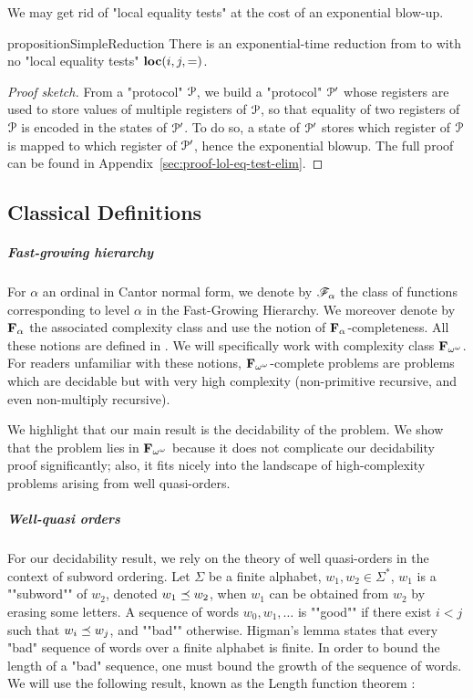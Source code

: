 We may get rid of "local equality tests" at the cost of an exponential blow-up.

\begin{restatable}{proposition}{SimpleReduction}
	\label{prop:loc-eq-test-elimination}
	There is an exponential-time reduction from \COVER to \COVER with no "local equality tests" $\textbf{loc}(i,j,=)$.
\end{restatable}
\begin{proof}[Proof sketch]
From a "protocol" $\mathcal{P}$, we build a "protocol" $\mathcal{P}'$ whose registers are used to store values of multiple registers of $\mathcal{P}$, so that equality of two registers of $\mathcal{P}$ is encoded in the states of $\mathcal{P}'$. To do so, a state of $\mathcal{P}'$ stores which register of $\mathcal{P}$ is mapped to which register of $\mathcal{P}'$, hence the exponential blowup. The full proof can be found in Appendix~\ref{sec:proof-lol-eq-test-elim}.
\end{proof}


\subsection{Classical Definitions}


\subparagraph*{Fast-growing hierarchy}

For $\alpha$ an ordinal in Cantor normal form, we denote by $\mathscr{F}_{\alpha}$ the class of functions corresponding to level $\alpha$ in the Fast-Growing Hierarchy. We moreover denote by $\mathbf{F}_{\alpha}$ the associated complexity class and use the notion of $\mathbf{F}_{\alpha}$-completeness. All these notions are defined in \cite{Schmitz16}. We will specifically work with complexity class $\mathbf{F}_{\omega^{\omega}}$. For readers unfamiliar with these notions, $\mathbf{F}_{\omega^{\omega}}$-complete problems are problems which are decidable but with very high complexity (non-primitive recursive, and even non-multiply recursive). 

We highlight that our main result is the decidability of the problem. We show that the problem lies in $\mathbf{F}_{\omega^{\omega}}$ because it does not complicate our decidability proof significantly; also, it fits nicely into the landscape of high-complexity problems arising from well quasi-orders. 

\subparagraph*{Well-quasi orders}

For our decidability result, we rely on the theory of well quasi-orders in the context of subword ordering.
Let $\Sigma$ be a finite alphabet, $w_1, w_2 \in \Sigma^*$, $w_1$ is a ""subword"" of $w_2$, denoted $w_1 \preceq w_2$, when $w_1$ can be obtained from $w_2$ by erasing some letters. 
A sequence of words $w_0, w_1, \ldots$ is ""good"" if there exist $i<j$ such that $w_i \preceq w_j$, and ""bad"" otherwise. Higman's lemma \cite{Higman52} states that every "bad" sequence of words over a finite alphabet is finite.
In order to bound the length of a "bad" sequence, one must bound the growth of the sequence of words. 
We will use the following result, known as the Length function theorem \cite{SchmitzS2011upperHigman}:

